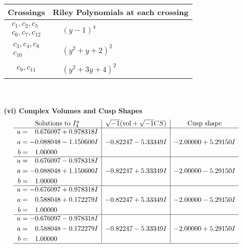 \documentclass[1p]{elsarticle_modified}
\theoremstyle{definition}
\newcommand{\I}{\sqrt{-1}}
\begin{document}
\begin{tabular}{m{50pt}|m{274pt}}
Crossings & \hspace{64pt}Riley Polynomials at each crossing \\
\hline $$\begin{aligned}c_{1},c_{2},c_{5}\\c_{6},c_{7},c_{12}\end{aligned}$$&$\begin{aligned}
&(y-1)^4
\end{aligned}$\\
\hline $$\begin{aligned}c_{3},c_{4},c_{8}\\c_{10}\end{aligned}$$&$\begin{aligned}
&(y^2+y+2)^2
\end{aligned}$\\
\hline $$\begin{aligned}c_{9},c_{11}\end{aligned}$$&$\begin{aligned}
&(y^2+3 y+4)^2
\end{aligned}$\\
\hline
\end{tabular}\\~\\
\newpage\flushleft \textbf{(vi) Complex Volumes and Cusp Shapes}
$$\begin{array}{c|c|c}  
\text{Solutions to }I^u_{4}& \I (\text{vol} + \sqrt{-1}CS) & \text{Cusp shape}\\
 \hline 
\begin{aligned}
u &= \phantom{-}0.676097 + 0.978318 I \\
a &= -0.088048 - 1.150600 I \\
b &= \phantom{-}1.00000\phantom{ +0.000000I}\end{aligned}
 & -0.82247 - 5.33349 I & -2.00000 + 5.29150 I \\ \hline\begin{aligned}
u &= \phantom{-}0.676097 - 0.978318 I \\
a &= -0.088048 + 1.150600 I \\
b &= \phantom{-}1.00000\phantom{ +0.000000I}\end{aligned}
 & -0.82247 + 5.33349 I & -2.00000 - 5.29150 I \\ \hline\begin{aligned}
u &= -0.676097 + 0.978318 I \\
a &= \phantom{-}0.588048 + 0.172279 I \\
b &= \phantom{-}1.00000\phantom{ +0.000000I}\end{aligned}
 & -0.82247 + 5.33349 I & -2.00000 - 5.29150 I \\ \hline\begin{aligned}
u &= -0.676097 - 0.978318 I \\
a &= \phantom{-}0.588048 - 0.172279 I \\
b &= \phantom{-}1.00000\phantom{ +0.000000I}\end{aligned}
 & -0.82247 - 5.33349 I & -2.00000 + 5.29150 I\\
 \hline 
 \end{array}$$\newpage\newpage\renewcommand{\arraystretch}{1}
\end{document}
